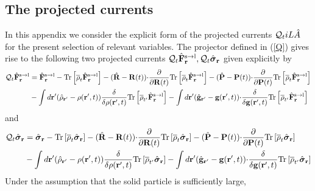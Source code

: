 \documentclass[b5paper,openright,11pt]{book}
\begin{document}
\begin{appendices}
\chapter{The projected currents}
\label{Ap:Projected}
In  this appendix  we  consider  the explicit  form  of the  projected
currents  ${\cal  Q}_tiL\hat{A}$  for  the  present  selection  of  relevant
variables.   The projector  defined  in (\ref{Q})  gives  rise to  the
following  two projected  currents  ${\cal  Q}_t\hat{\bf F}^{\rm  s\to
  l}_{{\bf r}},  {\cal Q}_t\hat{\boldsymbol{\sigma}}_{{\bf  r}}$ given
explicitly by
\begin{align}
  {\cal Q}_t\hat{\bf F}^{\rm s\to l}_{{\bf r}}&=
\hat{\bf F}^{\rm s\to l}_{{\bf r}}- {\rm Tr}\left[\overline{\rho}_{t} \hat{\bf F}^{\rm s\to l}_{{\bf r}}\right]
-(\hat{\bf R}-{\bf R}(t)){\cdot}\frac{\partial}{\partial {\bf R}(t)}
{\rm Tr}\left[\overline{\rho}_{t} \hat{\bf F}^{\rm s\to l}_{{\bf r}}\right]
-(\hat{\bf P}-{\bf P}(t)){\cdot}\frac{\partial}{\partial {\bf P}(t)}
{\rm Tr}\left[\overline{\rho}_{t} \hat{\bf F}^{\rm s\to l}_{{\bf r}}\right]
\nonumber\\
&-\int d{\bf r}'(\hat{\rho}_{{\bf r}'}-\rho({\bf r}',t))
\frac{\delta}{\delta \rho({\bf r}',t)}{\rm Tr}\left[\overline{\rho}_{t'}  \hat{\bf F}^{\rm s\to l}_{{\bf r}}\right]
-\int d{\bf r}'(\hat{\bf g}_{{\bf r}'}-{\bf g}({\bf r}',t))
{\cdot}\frac{\delta}{\delta {\bf g}({\bf r}',t)}{\rm Tr}\left[\overline{\rho}_{t'}  \hat{\bf F}^{\rm s\to l}_{{\bf r}}\right]
\label{QF0}
\end{align}
and 
\begin{align}
  {\cal Q}_t\hat{\boldsymbol{\sigma}}_{{\bf r}}&=
\hat{\boldsymbol{\sigma}}_{{\bf r}}- {\rm Tr}\left[\overline{\rho}_{t} \hat{\boldsymbol{\sigma}}_{{\bf r}}\right]
-(\hat{\bf R}-{\bf R}(t)){\cdot}\frac{\partial}{\partial {\bf R}(t)}
{\rm Tr}\left[\overline{\rho}_{t} \hat{\boldsymbol{\sigma}}_{{\bf r}}\right]
-(\hat{\bf P}-{\bf P}(t)){\cdot}\frac{\partial}{\partial {\bf P}(t)}
{\rm Tr}\left[\overline{\rho}_{t} \hat{\boldsymbol{\sigma}}_{{\bf r}}\right]
\nonumber\\
&-\int d{\bf r}'(\hat{\rho}_{{\bf r}'}-\rho({\bf r}',t))
\frac{\delta}{\delta \rho({\bf r}',t)}{\rm Tr}\left[\overline{\rho}_{t'}\hat{\boldsymbol{\sigma}}_{{\bf r}}\right]
-\int d{\bf r}'(\hat{\bf g}_{{\bf r}'}-{\bf g}({\bf r}',t))
{\cdot}\frac{\delta}{\delta {\bf g}({\bf r}',t)}{\rm Tr}\left[\overline{\rho}_{t'}  \hat{\boldsymbol{\sigma}}_{{\bf r}}\right]
\label{QS0}
\end{align}
Under the  assumption that the  solid particle is  sufficiently large,

\end{appendices}
\end{document}
